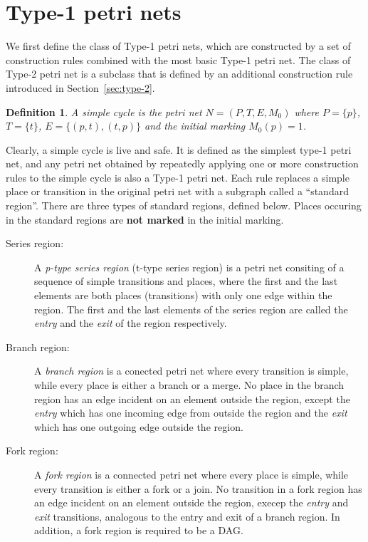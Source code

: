 \documentclass[12pt,a4paper]{article}
\newtheorem{definition}{Definition}
\begin{document}
\section{Type-1 petri nets}
\label{sec:type-1}

We first define the class of Type-1 petri nets, which are constructed
by a set of construction rules combined with the most basic Type-1
petri net. The class of Type-2 petri net is a subclass that is defined
by an additional construction rule introduced in
Section~\ref{sec:type-2}.

\begin{definition}
  A \emph{simple cycle} is the petri net $N = (P, T, E, M_0)$ where $P
  = \{p\}$, $T =\{t\}$, $E = \{(p,t), (t,p)\}$ and the
  initial marking $M_0(p) = 1$.
\end{definition}

Clearly, a simple cycle is live and safe. It is defined as the
simplest type-1 petri net, and any petri net obtained by repeatedly
applying one or more construction rules to the simple cycle is also a
Type-1 petri net. Each rule replaces a simple place or transition in
the original petri net with a subgraph called a ``standard region''.
There are three types of standard regions, defined below. Places
occuring in the standard regions are \textbf{not marked} in the
initial marking.

\begin{description}
\item [Series region:] A \emph{p-type series region} (t-type series
  region) is a petri net consiting of a sequence of simple transitions
  and places, where the first and the last elements are both places
  (transitions) with only one edge within the region. The first and
  the last elements of the series region are called the \emph{entry}
  and the \emph{exit} of the region respectively.

\item [Branch region:] A \emph{branch region} is a conected petri net
  where every transition is simple, while every place is either a
  branch or a merge. No place in the branch region has an edge
  incident on an element outside the region, except the \emph{entry}
  which has one incoming edge from outside the region and the
  \emph{exit} which has one outgoing edge outside the region.

\item [Fork region:] A \emph{fork region} is a connected petri net
  where every place is simple, while every transition is either a fork
  or a join. No transition in a fork region has an edge incident on an
  element outside the region, execep the \emph{entry} and \emph{exit}
  transitions, analogous to the entry and exit of a branch region. In
  addition, a fork region is required to be a DAG.
\end{description}
\end{document}
